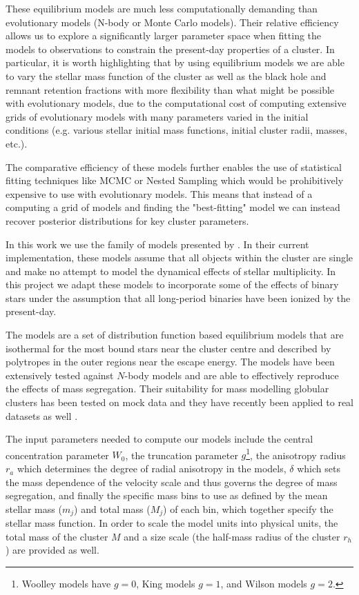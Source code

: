 These equilibrium models are much less computationally demanding than evolutionary models (N-body or
Monte Carlo models). Their relative efficiency allows us to explore a significantly larger parameter
space when fitting the models to observations to constrain the present-day properties of a cluster.
In particular, it is worth highlighting that by using equilibrium models we are able to vary the
stellar mass function of the cluster as well as the black hole and remnant retention fractions with
more flexibility than what might be possible with evolutionary models, due to the computational cost
of computing extensive grids of evolutionary models with many parameters varied in the initial
conditions (e.g. various stellar initial mass functions, initial cluster radii, masses, etc.).

The comparative efficiency of these models further enables the use of statistical fitting techniques
like MCMC or Nested Sampling which would be prohibitively expensive to use with evolutionary models.
This means that instead of a computing a grid of models and finding the "best-fitting" model we can
instead recover posterior distributions for key cluster parameters.

In this work we use the  family of models presented by \citet{Gieles2015}. In their
current implementation, these models assume that all objects within the cluster are single and make
no attempt to model the dynamical effects of stellar multiplicity. In this project we adapt these
models to incorporate some of the effects of binary stars under the assumption that all long-period
binaries have been ionized by the present-day.


The  models are a set of distribution function based equilibrium models that are
isothermal for the most bound stars near the cluster centre and described by polytropes in the outer
regions near the escape energy. The models have been extensively tested against $N$-body models
\citep{Zocchi2016, Peuten2017} and are able to effectively reproduce the effects of mass
segregation. Their suitability for mass modelling globular clusters has been tested on mock data
\citep{Henault-Brunet2019} and they have recently been applied to real datasets as well
\citep[e.g.][]{Gieles2018, Henault-Brunet2020}.



The input parameters needed to compute our models include the central concentration parameter $W_0$,
the truncation parameter $g$\footnote{Woolley models \citep{Woolley1954} have $g=0$, King models
	\citep{King1966} $g=1$, and Wilson models \citep{Wilson1975} $g=2$.}, the anisotropy radius $r_a$
which determines the degree of radial anisotropy in the models, $\delta$ which sets the mass
dependence of the velocity scale and thus governs the degree of mass segregation, and finally the
specific mass bins to use as defined by the mean stellar mass ($m_j$) and total mass ($M_j$) of each
bin, which together specify the stellar mass function. In order to scale the model units into
physical units, the total mass of the cluster $M$ and a size scale (the half-mass radius of the
cluster $r_h$) are provided as well.

